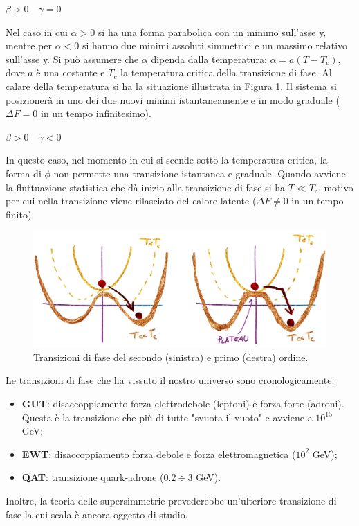 \begin{example}
    $\beta > 0 \quad \gamma = 0 $
\end{example}
Nel caso in cui $\alpha >0$ si ha una forma parabolica con un minimo sull'asse y, mentre per  $\alpha <0$ si hanno due minimi assoluti simmetrici e un massimo relativo sull'asse y. Si può assumere che $\alpha$ dipenda dalla temperatura: $\alpha =a(T-T_c)$, dove $a$ è una costante e $T_c$ la temperatura critica della transizione di fase. Al calare della temperatura si ha la situazione illustrata in Figura \ref{fig4:transfase}. Il sistema si posizionerà in uno dei due nuovi minimi istantaneamente e in modo graduale ($\Delta F = 0$ in un tempo infinitesimo).

\newpage
\begin{example}
    $\beta > 0 \quad \gamma < 0 $
\end{example}
In questo caso, nel momento in cui si scende sotto la temperatura critica, la forma di $\phi$ non permette una transizione istantanea e graduale. Quando avviene la fluttuazione statistica che dà inizio alla transizione di fase si ha $T \ll T_c$, motivo per cui nella transizione viene rilasciato del calore latente ($\Delta F \neq 0$ in un tempo finito).

\begin{figure}[ht]
    \centering
    \includegraphics[width=.85\textwidth]{Pictures/4/transfase.jpg}
    \caption{Transizioni di fase del secondo (sinistra) e primo (destra) ordine.}
    \label{fig4:transfase}
\end{figure}



\noindent Le transizioni di fase che ha vissuto il nostro universo sono cronologicamente:
\begin{itemize}
    \item \textbf{GUT}: disaccoppiamento forza elettrodebole (leptoni) e forza forte (adroni). Questa è la transizione che più di tutte "svuota il vuoto" e avviene a $10^{15 }$ GeV;
    \item \textbf{EWT}: disaccoppiamento forza debole e forza elettromagnetica ($10^{2}$ GeV);
    \item \textbf{QAT}: transizione quark-adrone ($0.2 \div 3$ GeV).
\end{itemize}
Inoltre, la teoria delle supersimmetrie prevederebbe un'ulteriore transizione di fase la cui scala è ancora oggetto di studio. 

